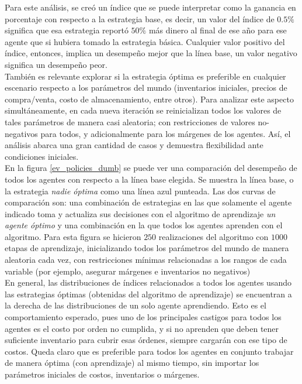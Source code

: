 Para este an\'alisis, se cre\'o un \'indice que se puede interpretar como la ganancia en porcentaje con respecto a la estrategia base, es decir, un valor del \'indice de $0.5\%$ significa que esa estrategia report\'o $50\%$ m\'as dinero al final de ese a\~no para ese agente que si hubiera tomado la estrategia b\'asica. Cualquier valor positivo del \'indice, entonces, implica un desempe\~no mejor que la l\'inea base, un valor negativo significa un desempe\~no peor.\\

Tambi\'en es relevante explorar si la estrategia \'optima es preferible en cualquier escenario respecto a los par\'ametros del mundo (inventarios iniciales, precios de compra/venta, costo de almacenamiento, entre otros). Para analizar este aspecto simult\'aneamente, en cada nueva iteraci\'on se reinicializan todos los valores de tales par\'ametros de manera casi aleatoria; con restricciones de valores no-negativos para todos, y adicionalmente para los m\'argenes de los agentes. As\'i, el an\'alisis abarca una gran cantidad de casos y demuestra flexibilidad ante condiciones iniciales.\\

En la figura \ref{ev_policies_dumb} se puede ver una comparaci\'on del desempe\~no de todos los agentes con respecto a la l\'inea base elegida. Se muestra la l\'inea base, o la estrategia \textit{nadie \'optima} como una l\'inea azul punteada. Las dos curvas de comparaci\'on son: una combinaci\'on de estrategias en las que solamente el agente indicado toma y actualiza sus decisiones con el algoritmo de aprendizaje \textit{un agente \'optimo} y una combinaci\'on en la que todos los agentes aprenden con el algoritmo. Para esta figura se hicieron $250$ realizaciones del algoritmo con $1000$ etapas de aprendizaje, inicializando todos los par\'ametros del mundo de manera aleatoria cada vez, con restricciones m\'inimas relacionadas a los rangos de cada variable (por ejemplo, asegurar m\'argenes e inventarios no negativos)\\

En general, las distribuciones de índices relacionados a todos los agentes usando las estrategias \'optimas (obtenidas del algoritmo de aprendizaje) se encuentran a la derecha de las distribuciones de un solo agente aprendiendo. Esto es el comportamiento esperado, pues uno de los principales castigos para todos los agentes es el costo por orden no cumplida, y si no aprenden que deben tener suficiente inventario para cubrir esas \'ordenes, siempre cargar\'an con ese tipo de costos. Queda claro que es preferible para todos los agentes en conjunto trabajar de manera \'optima (con aprendizaje) al mismo tiempo, sin importar los par\'ametros iniciales de costos, inventarios o m\'argenes.\\

